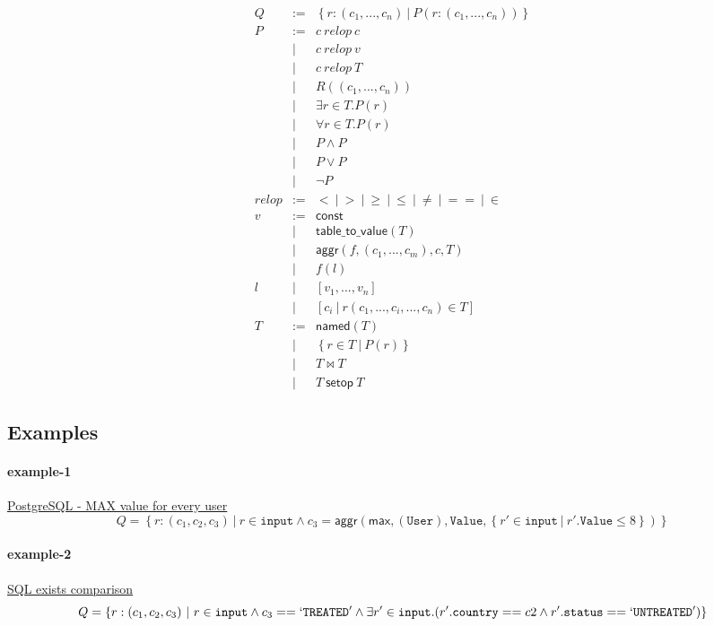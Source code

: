 \documentclass[letter, notitlepage]{article}
\begin{document}
\[
\begin{array}{rcl}
Q & := & \left\{r:(c_1,...,c_n) ~|~ P(r:(c_1,...,c_n)) \right\}\\
P &:= & c~\mathit{relop}~c \\
	& | & c~\mathit{relop}~v\\
	& | & c~\mathit{relop}~T\\
	& | & R((c_1,...,c_n))\\
	& | & \exists r\in T. P(r)\\
	& | & \forall r\in T. P(r)\\
	& | & P \land P\\
	& | & P \lor P\\
	& | & \neg P\\
\mathit{relop} &:=& < ~|~ > ~|~ \ge ~|~ \le ~|~ \neq ~|~ == ~|~ \in \\
v &:= & \mathsf{const} \\
	& | & \mathsf{table\_to\_value}(T)\\
	& | & \mathsf{aggr}(f, (c_1,...,c_m), c, T)\\
	& | & f(l)\\
l & | & [v_1,...,v_n]\\
	& | &  \left[c_i ~|~ r(c_1,...,c_i,...,c_n)\in T \right]\\
T &:= &\mathsf{named}(T)\\
	& | & \left\{r\in T ~|~ P(r)\right\}\\
	& | & T \bowtie T\\
	& | & T~\mathsf{setop}~T
\end{array}
\]

\subsection{Examples}
\paragraph{example-1} \href{http://stackoverflow.com/questions/33063073/postgresql-max-value-for-every-user}{PostgreSQL - MAX value for every user}
\[
	Q = \left\{ r:(c_1, c_2, c_3) ~|~ r\in \mathtt{input} \land c_3=\mathsf{aggr}(\mathsf{max}, (\mathtt{User}), \mathtt{Value}, \left\{r'\in \mathtt{input} ~|~ r'.\mathtt{Value} \le 8\right\} ) \right\}
\]

\paragraph{example-2} \href{http://stackoverflow.com/questions/11898003/sql-exists-comparison}{SQL exists comparison}
\[
	Q = \left\{ r:(c_1, c_2, c_3) ~|~ r\in \mathtt{input} \land c_3==`\mathtt{TREATED}' \land \exists r'\in \mathtt{input}.(r'.\mathtt{\mathtt{country}} == c2 \land r'.\mathtt{status} == `\mathtt{UNTREATED}') \right\}
\]
\end{document}

